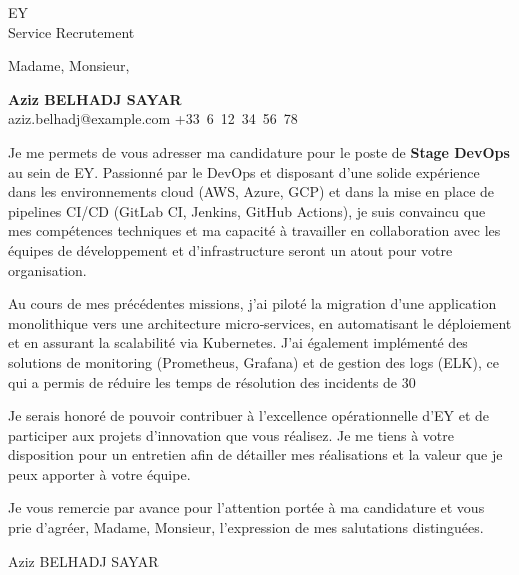 \documentclass[11pt,a4paper]{letter}
\makeatletter
\newcommand{\CandidateName}{Aziz BELHADJ SAYAR}
\newcommand{\CompanyName}{EY}
\newcommand{\Position}{Stage DevOps}
\newcommand{\ContactInfo}{aziz.belhadj@example.com \textbar{} +33~6~12~34~56~78}
\makeatother
\begin{document}
\begin{letter}{\CompanyName\\ Service Recrutement}
\opening{Madame, Monsieur,}

\begin{center}
\textbf{\Large \CandidateName}\\
\color{gray}\ContactInfo
\end{center}

\vspace{0.5cm}

Je me permets de vous adresser ma candidature pour le poste de \textbf{\Position} au sein de \CompanyName. Passionné par le DevOps et disposant d’une solide expérience dans les environnements cloud (AWS, Azure, GCP) et dans la mise en place de pipelines CI/CD (GitLab CI, Jenkins, GitHub Actions), je suis convaincu que mes compétences techniques et ma capacité à travailler en collaboration avec les équipes de développement et d’infrastructure seront un atout pour votre organisation.

Au cours de mes précédentes missions, j’ai piloté la migration d’une application monolithique vers une architecture micro‑services, en automatisant le déploiement et en assurant la scalabilité via Kubernetes. J’ai également implémenté des solutions de monitoring (Prometheus, Grafana) et de gestion des logs (ELK), ce qui a permis de réduire les temps de résolution des incidents de 30 %

Je serais honoré de pouvoir contribuer à l’excellence opérationnelle d’EY et de participer aux projets d’innovation que vous réalisez. Je me tiens à votre disposition pour un entretien afin de détailler mes réalisations et la valeur que je peux apporter à votre équipe.

Je vous remercie par avance pour l’attention portée à ma candidature et vous prie d’agréer, Madame, Monsieur, l’expression de mes salutations distinguées.

\closing{\CandidateName}
\end{letter}
\end{document}

